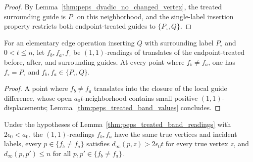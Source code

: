 \begin{proof}\leanok
    By Lemma~\ref{thm:peps_dyadic_no_changed_vertex}, the treated surrounding guide is $P_\circ$ on this neighborhood, and the single-label insertion property restricts both endpoint-treated guides to $\{P_\circ,Q\}$.
\end{proof}

\begin{lemma}
    \label{thm:peps_treated_band_readings}
    \leanok
    For an elementary edge operation inserting $Q$ with surrounding label $P_\circ$ and $0<t\le n$, let $f_b,f_a,f_\circ$ be $(1,1)$-readings of translates of the endpoint-treated before, after, and surrounding guides. At every point where $f_b\ne f_a$, one has $f_\circ=P_\circ$ and $f_b,f_a\in\{P_\circ,Q\}$.
\end{lemma}

\begin{proof}\leanok
    A point where $f_b\ne f_a$ translates into the closure of the local guide difference, whose open $a_0t$-neighborhood contains small positive $(1,1)$-displacements; Lemma~\ref{thm:peps_treated_band_values} concludes.
\end{proof}

\begin{lemma}
    \label{thm:peps_treated_band_frame_facts}
    \leanok
    Under the hypotheses of Lemma~\ref{thm:peps_treated_band_readings} with $2\epsilon_0<a_0$, the $(1,1)$-readings $f_b,f_a$ have the same true vertices and incident labels, every $p\in\{f_b\ne f_a\}$ satisfies $d_\infty(p,z)>2\epsilon_0t$ for every true vertex $z$, and $d_\infty(p,p')\le n$ for all $p,p'\in\{f_b\ne f_a\}$.
\end{lemma}

